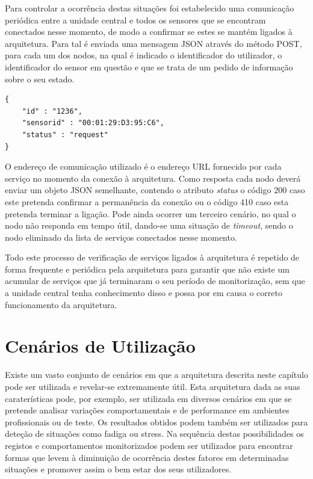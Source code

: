 Para controlar a ocorrência destas situações foi estabelecido uma comunicação periódica entre a unidade central e todos os sensores que se encontram conectados nesse momento, de modo a confirmar se estes se mantém ligados à arquitetura. Para tal é enviada uma mensagem JSON através do método POST, para cada um dos nodos, na qual é indicado o identificador do utilizador, o identificador do sensor em questão e que se trata de um pedido de informação sobre o seu estado.\\

\begin{lstlisting}[caption=Mensagem de verificação de estado de um nodo]
{
	"id" : "1236",
  	"sensorid" : "00:01:29:D3:95:C6",
	"status" : "request"
}

\end{lstlisting}

O endereço de comunicação utilizado é o endereço URL fornecido por cada serviço no momento da conexão à arquitetura. Como resposta cada nodo deverá enviar um objeto JSON semelhante, contendo o atributo \textit{status} o código 200 caso este pretenda confirmar a permanência da conexão ou o código 410 caso esta pretenda terminar a ligação. Pode ainda ocorrer um terceiro cenário, no qual o nodo não responda em tempo útil, dando-se uma situação de \textit{timeout}, sendo o nodo eliminado da lista de serviços conectados nesse momento.

Todo este processo de verificação de serviços ligados à arquitetura é repetido de forma frequente e periódica pela arquitetura para garantir que não existe um acumular de serviços que já terminaram o seu período de monitorização, sem que a unidade central tenha conhecimento disso e possa por em causa o correto funcionamento da arquitetura.

\section{Cenários de Utilização}

Existe um vasto conjunto de cenários em que a arquitetura descrita neste capítulo pode ser utilizada e revelar-se extremamente útil. Esta arquitetura dada as suas caraterísticas pode, por exemplo, ser utilizada em diversos cenários em que se pretende analisar variações comportamentais e de performance em ambientes profissionais ou de teste. Os resultados obtidos podem também ser utilizados para deteção de situações como fadiga ou stress. Na sequência destas possibilidades os registos e comportamentos monitorizados podem ser utilizados para encontrar formas que levem à diminuição de ocorrência destes fatores em determinadas situações e promover assim o bem estar dos seus utilizadores.

